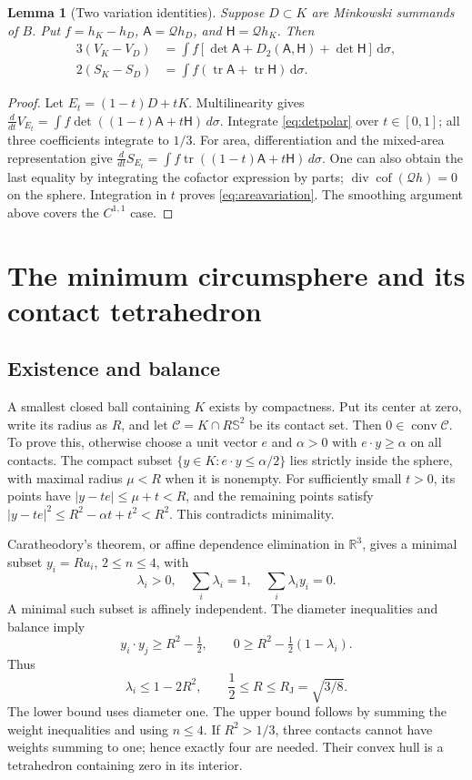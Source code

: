 \documentclass[11pt]{article}
\numberwithin{equation}{section}
\newtheorem{lemma}[theorem]{Lemma}
\theoremstyle{definition}\newtheorem{definition}[theorem]{Definition}
\theoremstyle{remark}\newtheorem{remark}[theorem]{Remark}
\newcommand{\R}{\mathbb R}
\newcommand{\Sph}{\mathbb S^2}
\newcommand{\conv}{\operatorname{conv}}
\newcommand{\tr}{\operatorname{tr}}
\newcommand{\cof}{\operatorname{cof}}
\newcommand{\Qh}{\mathcal Q}
\newcommand{\RJ}{R_{\mathrm J}}
\newcommand{\dd}{\,\mathrm d}
\newcommand{\cA}{\mathsf A}
\newcommand{\cH}{\mathsf H}
\begin{document}
\begin{lemma}[Two variation identities]\label{lem:variations}
Suppose $D\subset K$ are Minkowski summands of $B$. Put
$f=h_K-h_D$, $\cA=\Qh h_D$, and $\cH=\Qh h_K$. Then
\begin{align}
 3(V_K-V_D)&=\int f[\det\cA+D_2(\cA,\cH)+\det\cH]\dd\sigma,
       \label{eq:volvariation}\\
 2(S_K-S_D)&=\int f(\tr\cA+\tr\cH)\dd\sigma.
       \label{eq:areavariation}
\end{align}
\end{lemma}
\begin{proof}
Let $E_t=(1-t)D+tK$. Multilinearity gives
$\frac{d}{dt}V_{E_t}=\int f\det((1-t)\cA+t\cH)\,d\sigma$.
Integrate \cref{eq:detpolar} over $t\in[0,1]$; all three coefficients
integrate to $1/3$. For area, differentiation and the mixed-area
representation give
$\frac{d}{dt}S_{E_t}=\int f\tr((1-t)\cA+t\cH)\,d\sigma$.
One can also obtain the last equality by integrating the cofactor expression
by parts; $\operatorname{div}\cof(\Qh h)=0$ on the sphere. Integration in $t$
proves \cref{eq:areavariation}. The smoothing argument above covers the
$C^{1,1}$ case.
\end{proof}

\section{The minimum circumsphere and its contact tetrahedron}\label{sec:contacts}
\subsection{Existence and balance}
A smallest closed ball containing $K$ exists by compactness. Put its center at
zero, write its radius as $R$, and let $\mathcal C=K\cap R\Sph$ be its contact
set. Then $0\in\conv\mathcal C$. To prove this, otherwise choose a unit
vector $e$ and $\alpha>0$ with $e\cdot y\ge\alpha$ on all contacts. The
compact subset $\{y\in K:e\cdot y\le\alpha/2\}$ lies strictly inside the
sphere, with maximal radius $\mu<R$ when it is nonempty. For sufficiently
small $t>0$, its points have $|y-te|\le\mu+t<R$, and the remaining points
satisfy $|y-te|^2\le R^2-\alpha t+t^2<R^2$. This contradicts minimality.

Caratheodory's theorem, or affine dependence elimination in $\R^3$, gives a
minimal subset $y_i=Ru_i$, $2\le n\le4$, with
\begin{equation}\label{eq:balance}
 \lambda_i>0,\quad\sum_i\lambda_i=1,\quad\sum_i\lambda_i y_i=0.
\end{equation}
A minimal such subset is affinely independent. The diameter inequalities and
balance imply
\[
 y_i\cdot y_j\ge R^2-\tfrac12,\qquad
 0\ge R^2-\tfrac12(1-\lambda_i).
\]
Thus
\begin{equation}\label{eq:weightbound}
 \lambda_i\le1-2R^2,\qquad
 \frac12\le R\le\RJ=\sqrt{3/8}.
\end{equation}
The lower bound uses diameter one. The upper bound follows by summing the
weight inequalities and using $n\le4$. If $R^2>1/3$, three contacts cannot
have weights summing to one; hence exactly four are needed. Their convex
hull is a tetrahedron containing zero in its interior.
\end{document}
